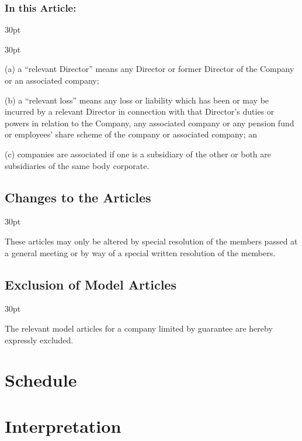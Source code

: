 \documentclass[12pt]{article}
\def\clauseindent{30pt}
\newenvironment{subindentpara}{\raggedright\begin{adjustwidth}{\clauseindent}{}\begin{hanginglist}}{\end{hanginglist}\end{adjustwidth}}
\newenvironment{subindentlist}{\raggedright\begin{adjustwidth}{\clauseindent}{}\begin{labeledlist}{\clauseindent}}{\end{labeledlist}\end{adjustwidth}}
\begin{document}
\subsubsection[Specifics of Purchase and Maintenance of Insurance]{In this Article:}
\begin{subindentlist}
    \item [(a)] a ``relevant Director'' means any Director or former Director of the Company or an associated company;
    \item [(b)] a ``relevant loss'' means any loss or liability which has been or may be incurred by a relevant Director in connection with that Director's duties or powers in relation to the Company, any associated company or any pension fund or employees' share scheme of the company or associated company; an
    \item [(c)] companies are associated if one is a subsidiary of the other or both are subsidiaries of the same body corporate.
\end{subindentlist}

\subsection{Changes to the Articles}
\begin{subindentpara}
    \item These articles may only be altered by special resolution of the members passed at a general meeting or by way of a special written resolution of the members.
\end{subindentpara}

\subsection{Exclusion of Model Articles}
\begin{subindentpara}
    \item The relevant model articles for a company limited by guarantee are hereby expressly excluded.
\end{subindentpara}

\setcounter{section}{0}
\setcounter{subsection}{0}

\newpage\section*{\huge{Schedule}}
\section*{\huge{Interpretation}}
\end{document}
